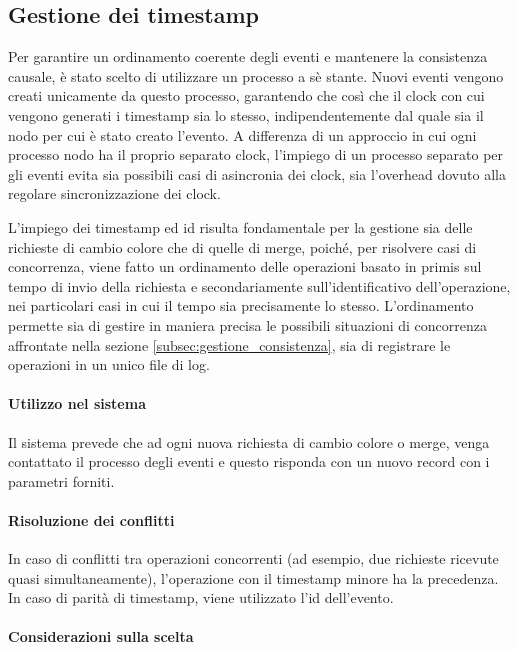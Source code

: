 \documentclass[12pt, a4paper]{report}
\begin{document}
\subsection{Gestione dei timestamp}\label{subsec:gestione_timestamp}

Per garantire un ordinamento coerente degli eventi e mantenere la consistenza causale, \`e stato scelto di utilizzare un processo a s\`e stante. Nuovi eventi vengono creati unicamente da questo processo, garantendo che cos\`i che il clock con cui vengono generati i timestamp sia lo stesso, indipendentemente dal quale sia il nodo per cui \`e stato creato l'evento. A differenza di un approccio in cui ogni processo nodo ha il proprio separato clock, l'impiego di un processo separato per gli eventi evita sia possibili casi di asincronia dei clock, sia l'overhead dovuto alla regolare sincronizzazione dei clock.

L'impiego dei timestamp ed id risulta fondamentale per la gestione sia delle richieste di cambio colore che di quelle di merge, poiché, per risolvere casi di concorrenza, viene fatto un ordinamento delle operazioni basato in primis sul tempo di invio della richiesta e secondariamente sull'identificativo dell'operazione, nei particolari casi in cui il tempo sia precisamente lo stesso. L'ordinamento permette sia di gestire in maniera precisa le possibili situazioni di concorrenza affrontate nella sezione \ref{subsec:gestione_consistenza}, sia di registrare le operazioni in un unico file di log.

\paragraph{Utilizzo nel sistema}

Il sistema prevede che ad ogni nuova richiesta di cambio colore o merge, venga contattato il processo degli eventi e questo risponda con un nuovo record con i parametri forniti.

\paragraph{Risoluzione dei conflitti}

In caso di conflitti tra operazioni concorrenti (ad esempio, due richieste ricevute quasi simultaneamente), l'operazione con il timestamp minore ha la precedenza. In caso di parit\`a di timestamp, viene utilizzato l'id dell'evento.

\paragraph{Considerazioni sulla scelta}
\end{document}
